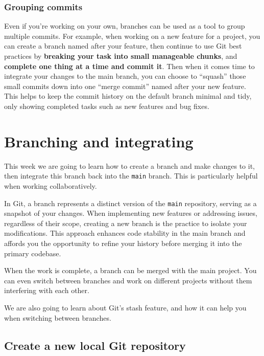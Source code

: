 \documentclass[
  letterpaper,
  DIV=11,
  numbers=noendperiod]{scrartcl}
\begin{document}
\subsubsection{Grouping commits}\label{grouping-commits}

Even if you're working on your own, branches can be used as a tool to
group multiple commits. For example, when working on a new feature for a
project, you can create a branch named after your feature, then continue
to use Git best practices by \textbf{breaking your task into small
manageable chunks}, and \textbf{complete one thing at a time and commit
it}. Then when it comes time to integrate your changes to the main
branch, you can choose to ``squash'' those small commits down into one
``merge commit'' named after your new feature. This helps to keep the
commit history on the default branch minimal and tidy, only showing
completed tasks such as new features and bug fixes.

\section{Branching and integrating}\label{branching-and-integrating}

This week we are going to learn how to create a branch and make changes
to it, then integrate this branch back into the \texttt{main} branch.
This is particularly helpful when working collaboratively.

In Git, a branch represents a distinct version of the \texttt{main}
repository, serving as a snapshot of your changes. When implementing new
features or addressing issues, regardless of their scope, creating a new
branch is the practice to isolate your modifications. This approach
enhances code stability in the main branch and affords you the
opportunity to refine your history before merging it into the primary
codebase.

When the work is complete, a branch can be merged with the main project.
You can even switch between branches and work on different projects
without them interfering with each other.

We are also going to learn about Git's stash feature, and how it can
help you when switching between branches.

\subsection{Create a new local Git
repository}\label{create-a-new-local-git-repository}
\end{document}
